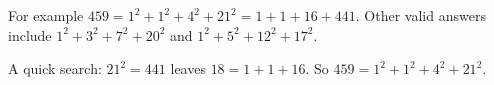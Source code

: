For example $459=1^2+1^2+4^2+21^2=1+1+16+441$. Other valid answers include $1^2+3^2+7^2+20^2$ and $1^2+5^2+12^2+17^2$.

A quick search: $21^2=441$ leaves $18=1+1+16$. So $\boxed{459=1^2+1^2+4^2+21^2}$.
